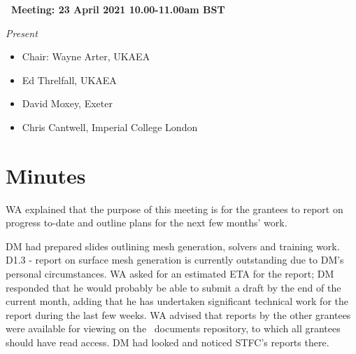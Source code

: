 
\centerline{\bf \large \textbf{\nep\  Meeting: 23 April 2021 10.00-11.00am BST}}

\emph{Present}

\begin{itemize}
\item Chair: Wayne Arter, UKAEA
\item Ed Threlfall, UKAEA
\item David Moxey, Exeter
\item Chris Cantwell, Imperial College London

\end{itemize}

\section{Minutes}

WA explained that the purpose of this meeting is for the grantees to report on 
progress to-date and outline plans for the next few months' work.

DM had prepared slides outlining mesh generation, solvers and training work.  
D1.3 - report on surface mesh generation is currently outstanding due to DM's 
personal circumstances.  WA asked for an estimated ETA for the report; DM 
responded that he would probably be able to submit a draft by the end of the 
current month, adding that he has undertaken significant technical work for the 
report during the last few weeks.  WA advised that reports by the other 
grantees were available for viewing on the \nep\  documents repository, to 
which all grantees should have read access.  DM had looked and noticed STFC's 
reports there.


